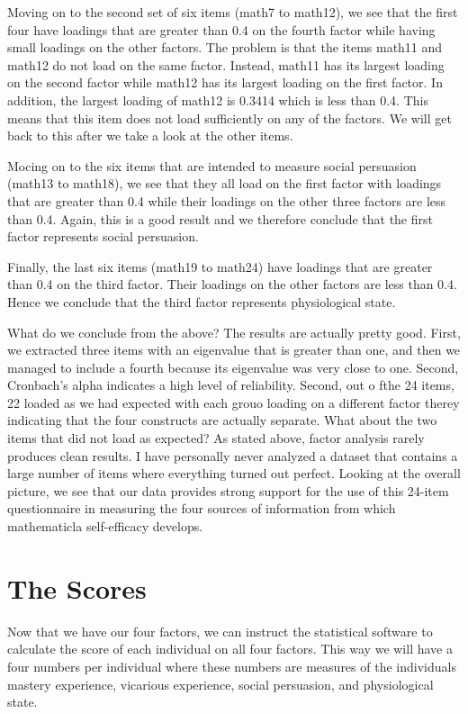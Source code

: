 \documentclass[a4paper,12pt,oneside]{book}
\begin{document}
Moving on to the second set of six items (math7 to math12), we see that the first four have loadings that are greater than 0.4 on the fourth
factor while having small loadings on the other factors. The problem is that the items math11 and math12 do not load on the same factor. Instead,
math11 has its largest loading on the second factor while math12 has its largest loading on the first factor. In addition, the largest loading
of math12 is 0.3414 which is less than 0.4. This means that this item does not load sufficiently on any of the factors. We will get back to this
after we take a look at the other items. 

Mocing on to the six items that are intended to measure social persuasion (math13 to math18), we see that they all load on the first factor with 
loadings that are greater than 0.4 while their loadings on the other three factors are less than 0.4. Again, this is a good result and we therefore
conclude that the first factor represents social persuasion.

Finally, the last six items (math19 to math24) have loadings that are greater than 0.4 on the third factor. Their loadings on the other factors
are less than 0.4. Hence we conclude that the third factor represents physiological state. 

What do we conclude from the above? The results are actually pretty good. First, we extracted three items with an eigenvalue that is greater than
one, and then we managed to include a fourth because its eigenvalue was very close to one. Second, Cronbach's alpha indicates a high level of
reliability. Second, out o fthe 24 items, 22 loaded as we had expected with each grouo loading on a different factor therey indicating that the four
constructs are actually separate. What about the two items that did not load as expected? As stated above, factor analysis rarely produces clean
results. I have personally never analyzed a dataset that contains a large number of items where everything turned out perfect. Looking at the overall
picture, we see that our data provides strong support for the use of this 24-item questionnaire in measuring the four sources of information from
which mathematicla self-efficacy develops. 

\section{The Scores}
Now that we have our four factors, we can instruct the statistical software to calculate the score of each individual on all four factors. This way
we will have a four numbers per individual where these numbers are measures of the individuals mastery experience, vicarious experience, social
persuasion, and physiological state.
\end{document}
